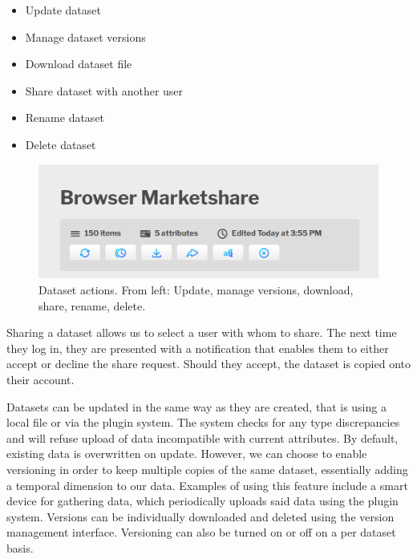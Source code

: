 \documentclass{article}
\begin{document}
\begin{itemize}
    \item Update dataset
    \item Manage dataset versions
    \item Download dataset file
    \item Share dataset with another user
    \item Rename dataset
    \item Delete dataset
\end{itemize}

\begin{figure}[!h]
\centering
\includegraphics[scale=0.3]{images/manager_actions}
\caption{Dataset actions. From left: Update, manage versions, download, share, rename, delete.}
\label{fig:manageractions}
\end{figure}

Sharing a dataset allows us to select a user with whom to share. The next time they log in, they are presented with a notification that enables them to either accept or decline the share request. Should they accept, the dataset is copied onto their account.\\

\newpage

Datasets can be updated in the same way as they are created, that is using a local file or via the plugin system. The system checks for any type discrepancies and will refuse upload of data incompatible with current attributes. By default, existing data is overwritten on update. However, we can choose to enable versioning in order to keep multiple copies of the same dataset, essentially adding a temporal dimension to our data. Examples of using this feature include a smart device for gathering data, which periodically uploads said data using the plugin system. Versions can be individually downloaded and deleted using the version management interface. Versioning can also be turned on or off on a per dataset basis.\\
\end{document}
